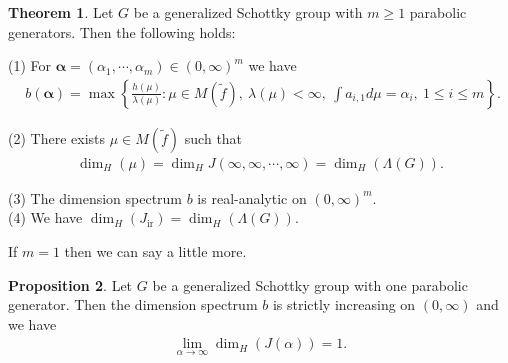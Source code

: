\documentclass{article}
\theoremstyle{definition}
\newtheorem{thm}{Theorem}[section]
\newtheorem{prop}[thm]{Proposition}
\begin{document}
\begin{thm}\label{main}
     Let $G$ be a generalized Schottky group with $m\geq1$ parabolic generators. Then the following holds:
    
    (1) For $\boldsymbol{\alpha}=(\alpha_1,\cdots,\alpha_m)\in(0,\infty)^m$ we have 
    \begin{align*}
       \ \  b(\boldsymbol{\alpha})=\max\left\{\frac{h(\mu)}{\lambda(\mu)}:\mu\in M(\tilde f),\ \lambda(\mu)<\infty,\ \int a_{i,1}d\mu=\alpha_i,\ 1\leq i\leq m\right\}.
    \end{align*}
    
    (2) There exists $\mu\in M(\tilde f)$ such that 
    \begin{align*}
    \dim_H(\mu)=\dim_H J(\infty,\infty,\cdots,\infty)=\dim_H(\Lambda(G)).
\end{align*}

    (3) The dimension spectrum $b$ is real-analytic on $(0,\infty)^m$.\\
    
    (4) We have $\dim_H(J_{\text{ir}})=\dim_H(\Lambda(G))$.\\
\end{thm}
If $m=1$ then we can say a little more.
\begin{prop}\label{Proposition m=1 case}
Let $G$ be a generalized Schottky group with one parabolic generator. Then the dimension spectrum $b$ is strictly increasing on $(0,\infty)$ and we have 
    \begin{align*}
    \lim_{\alpha\to\infty}\dim_H(J(\alpha))=1.
       \end{align*}    
\end{prop}
    
\end{document}
